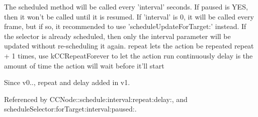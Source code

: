 The scheduled method will be called every 'interval' seconds. If paused is Y\-E\-S, then it won't be called until it is resumed. If 'interval' is 0, it will be called every frame, but if so, it recommended to use 'schedule\-Update\-For\-Target\-:' instead. If the selector is already scheduled, then only the interval parameter will be updated without re-\/scheduling it again. repeat lets the action be repeated repeat + 1 times, use k\-C\-C\-Repeat\-Forever to let the action run continuously delay is the amount of time the action will wait before it'll start

\begin{DoxySince}{Since}
v0.., repeat and delay added in v1. 
\end{DoxySince}


Referenced by C\-C\-Node\-::schedule\-:interval\-:repeat\-:delay\-:, and schedule\-Selector\-:for\-Target\-:interval\-:paused\-:.



